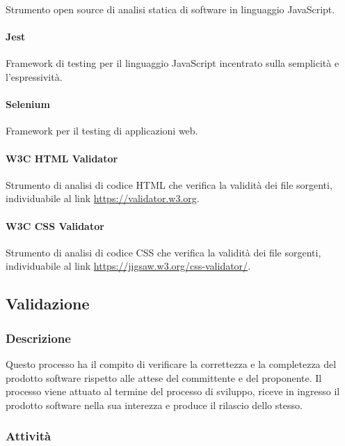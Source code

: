 Strumento open source di analisi statica di software in linguaggio JavaScript.

\paragraph{Jest}
\label{par:verifica:jest}

Framework di testing per il linguaggio JavaScript incentrato sulla semplicità e l'espressività.

\paragraph{Selenium}
\label{par:verifica:selenium}

Framework per il testing di applicazioni web.

\paragraph{W3C HTML Validator}
\label{par:html_validator}

Strumento di analisi di codice HTML che verifica la validità dei file sorgenti, individuabile al link \url{https://validator.w3.org}.

\paragraph{W3C CSS Validator}
\label{par:css_validator}

Strumento di analisi di codice CSS che verifica la validità dei file sorgenti, individuabile al link \url{https://jigsaw.w3.org/css-validator/}.
\subsection{Validazione}

\subsubsection{Descrizione}
\label{ssub:descrizione}

Questo processo ha il compito di verificare la correttezza e la completezza del prodotto software rispetto alle attese del committente e 
del proponente. Il processo viene attuato al termine del processo di sviluppo, riceve in ingresso il prodotto software nella sua interezza 
e produce il rilascio dello stesso.

\subsubsection{Attività}
\label{ssub:validazione:attivita}

